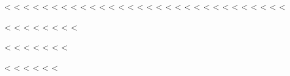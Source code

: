 <%
<%
<%
<%
<%
<%
<%
<%
<%
<%
<%
<%
<%
<%
<%
<%
<%
<%
<%
<%
<%
<%
<%
<%
<%
<%
<%
<%
<%
<%

<%
<%
<%
<%
<%
<%
<%
<%

<%
<%
<%
<%
<%
<%
<%

<%
<%
<%
<%
<%
<%

